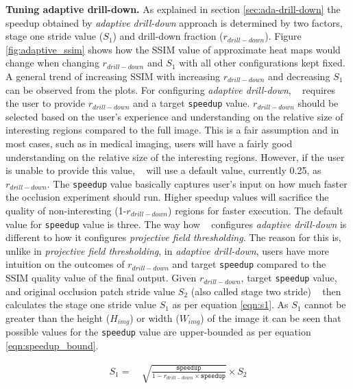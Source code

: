 \vspace{2mm}
\noindent \textbf{Tuning adaptive drill-down.}
As explained in section \ref{sec:ada-drill-down} the speedup obtained by \textit{adaptive drill-down} approach is determined by two factors, stage one stride value ($S_1$) and drill-down fraction ($r_{drill-down}$).
Figure \ref{fig:adaptive_ssim} shows how the SSIM value of approximate heat maps would change when changing $r_{drill-down}$ and $S_1$ with all other configurations kept fixed.
A general trend of increasing SSIM with increasing $r_{drill-down}$ and decreasing $S_1$ can be observed from the plots.
For configuring \textit{adaptive drill-down}, \system~ requires the user to provide $r_{drill-down}$ and a target \texttt{speedup} value.
$r_{drill-down}$ should be selected based on the user's experience and understanding on the relative size of interesting regions compared to the full image.
This is a fair assumption and in most cases, such as in medical imaging, users will have a fairly good understanding on the relative size of the interesting regions.
However, if the user is unable to provide this value, \system~ will use a default value, currently 0.25, as $r_{drill-down}$.
The \texttt{speedup} value basically captures user's input on how much faster the occlusion experiment should run.
Higher speedup values will sacrifice the quality of non-interesting (1-$r_{drill-down}$) regions for faster execution.
The default value for \texttt{speedup} value is three.
The way how \system~ configures \textit{adaptive drill-down} is different to how it configures \textit{projective field thresholding}.
The reason for this is, unlike in \textit{projective field thresholding}, in \textit{adaptive drill-down}, users have more intuition on the outcomes of $r_{drill-down}$ and target \texttt{speedup} compared to the SSIM quality value of the final output.
Given $r_{drill-down}$, target \texttt{speedup} value, and original occlusion patch stride value $S_2$ (also called stage two stride) \system~ then calculates the stage one stride value $S_1$ as per equation \ref{eqn:s1}.
As $S_1$ cannot be greater than the height ($H_{img}$) or width ($W_{img}$) of the image it can be seen that possible values for the \texttt{speedup} value are upper-bounded as per equation \ref{eqn:speedup_bound}.

\begin{align}
\label{eqn:s1}
S_1 = &~ \sqrt{\frac{\texttt{speedup}}{1 - r_{drill-down} \times \texttt{speedup}}} \times S_2
\end{align}

